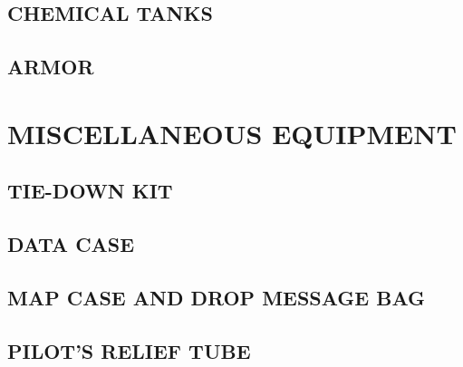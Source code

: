 \subsection{CHEMICAL TANKS}
\subsection{ARMOR}


\section{MISCELLANEOUS EQUIPMENT}
\subsection{TIE-DOWN KIT}
\subsection{DATA CASE}
\subsection{MAP CASE AND DROP MESSAGE BAG}
\subsection{PILOT'S RELIEF TUBE}


\cleardoublepage